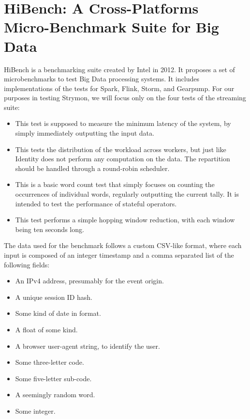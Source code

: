 \section{HiBench: A Cross-Platforms Micro-Benchmark Suite for Big Data}
HiBench\cite{hibench} is a benchmarking suite created by Intel in 2012. It proposes a set of microbenchmarks to test Big Data processing systems. It includes implementations of the tests for Spark, Flink, Storm, and Gearpump. For our purposes in testing Strymon, we will focus only on the four tests of the streaming suite:

\begin{itemize}
\item {} This test is supposed to measure the minimum latency of the system, by simply immediately outputting the input data.
\item {} This tests the distribution of the workload across workers, but just like Identity does not perform any computation on the data. The repartition should be handled through a round-robin scheduler.
\item {} This is a basic word count test that simply focuses on counting the occurrences of individual words, regularly outputting the current tally. It is intended to test the performance of stateful operators.
\item {} This test performs a simple hopping window reduction, with each window being ten seconds long.
\end{itemize}

The data used for the benchmark follows a custom CSV-like format, where each input is composed of an integer timestamp and a comma separated list of the following fields:

\begin{itemize}
\item {} An IPv4 address, presumably for the event origin.
\item {} A unique session ID hash.
\item {} Some kind of date in  format.
\item {} A float of some kind.
\item {} A browser user-agent string, to identify the user.
\item {} Some three-letter code.
\item {} Some five-letter sub-code.
\item {} A seemingly random word.
\item {} Some integer.
\end{itemize}

